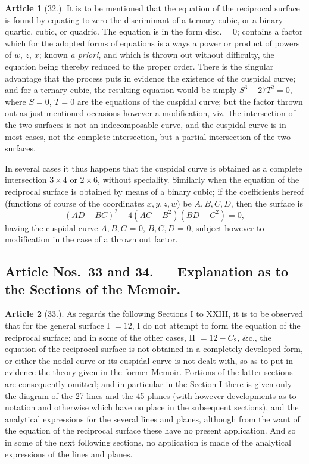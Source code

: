 \documentclass[11pt,a4paper]{article}
\theoremstyle{definition}
\newtheorem{art}{Article}
\begin{document}
\begin{art}[32.]
It is to be mentioned that the equation of the reciprocal surface is found by equating to zero the discriminant of a ternary cubic, or a binary quartic, cubic, or quadric. The equation is in the form $\text{disc.} = 0$; contains a factor which for the adopted forms of equations is always a power or product of powers of $w$, $z$, $x$; known \textit{a priori}, and which is thrown out without difficulty, the equation being thereby reduced to the proper order. There is the singular advantage that the process puts in evidence the existence of the cuspidal curve; and for a ternary cubic, the resulting equation would be simply $S^3 - 27T^2 = 0$, where $S = 0$, $T = 0$ are the equations of the cuspidal curve; but the factor thrown out as just mentioned occasions however a modification, viz.\ the intersection of the two surfaces is not an indecomposable curve, and the cuspidal curve is in most cases, not the complete intersection, but a partial intersection of the two surfaces.

In several cases it thus happens that the cuspidal curve is obtained as a complete intersection $3 \times 4$ or $2 \times 6$, without speciality. Similarly when the equation of the reciprocal surface is obtained by means of a binary cubic; if the coefficients hereof (functions of course of the coordinates $x, y, z, w$) be $A, B, C, D$, then the surface is
\[
(AD - BC)^2 - 4(AC - B^2)(BD - C^2) = 0,
\]
having the cuspidal curve $A, B, C$ = 0, $B, C, D$ = 0, subject however to modification in the case of a thrown out factor.
\end{art}

\newpage
\setcounter{page}{371}

\subsection*{Article Nos.~33 and 34. --- Explanation as to the Sections of the Memoir.}

\begin{art}[33.]
As regards the following Sections I to XXIII, it is to be observed that for the general surface I $= 12$, I do not attempt to form the equation of the reciprocal surface; and in some of the other cases, II $= 12 - C_2$, \&c., the equation of the reciprocal surface is not obtained in a completely developed form, or either the nodal curve or its cuspidal curve is not dealt with, so as to put in evidence the theory given in the former Memoir. Portions of the latter sections are consequently omitted; and in particular in the Section I there is given only the diagram of the 27 lines and the 45 planes (with however developments as to notation and otherwise which have no place in the subsequent sections), and the analytical expressions for the several lines and planes, although from the want of the equation of the reciprocal surface these have no present application. And so in some of the next following sections, no application is made of the analytical expressions of the lines and planes.
\end{art}
\end{document}
